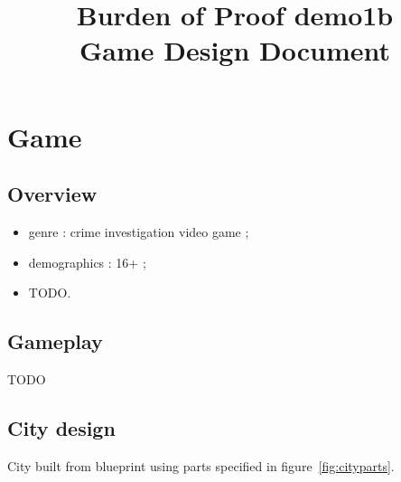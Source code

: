 \documentclass[a4paper, twoside]{article}
\begin{document}
\title{Burden of Proof demo1b \\ Game Design Document}

\maketitle

\tableofcontents

\newpage

\section{Game}

\subsection{Overview}

\begin{itemize}
	\item{} genre : crime investigation video game ;
	\item{} demographics : 16+ ;
	\item{} TODO.
\end{itemize}

\newpage

\subsection{Gameplay}

TODO

\newpage

\subsection{City design}

City built from blueprint using parts specified in figure~\ref{fig:cityparts}.
\end{document}
